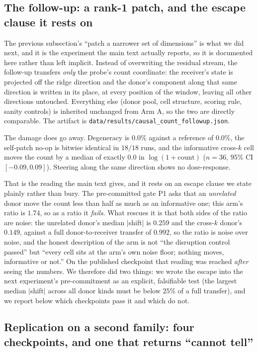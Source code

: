 \documentclass[11pt]{article}
\begin{document}
\subsection{The follow-up: a rank-1 patch, and the escape clause it rests on}

The previous subsection's ``patch a narrower set of dimensions'' is what we did
next, and it is the experiment the main text actually reports, so it is
documented here rather than left implicit. Instead of overwriting the residual
stream, the follow-up transfers \emph{only} the probe's count coordinate: the
receiver's state is projected off the ridge direction and the donor's component
along that same direction is written in its place, at every position of the
window, leaving all other directions untouched. Everything else (donor pool,
cell structure, scoring rule, sanity controls) is inherited unchanged from
Arm A, so the two are directly comparable. The artifact is
\texttt{data/results/causal\_count\_followup.json}.

The damage does go away. Degeneracy is $0.0\%$ against a reference of $0.0\%$,
the self-patch no-op is bitwise identical in $18/18$ runs, and the informative
cross-$k$ cell moves the count by a median of exactly $0.0$ in
$\log(1{+}\text{count})$ ($n{=}36$, $95\%$ CI $[-0.09,0.09]$). Steering along
the same direction shows no dose-response.

That is the reading the main text gives, and it rests on an escape clause we
state plainly rather than bury. The pre-committed gate P1 asks that an
\emph{unrelated} donor move the count less than half as much as an informative
one; this arm's ratio is $1.74$, so as a ratio it \emph{fails}. What rescues it
is that both sides of the ratio are noise: the unrelated donor's median
$|$shift$|$ is $0.259$ and the cross-$k$ donor's $0.149$, against a full
donor-to-receiver transfer of $0.992$, so the ratio is noise over noise, and
the honest description of the arm is not ``the disruption control passed'' but
``every cell sits at the arm's own noise floor; nothing moves, informative or
not.'' On the published checkpoint that reading was reached \emph{after} seeing
the numbers. We therefore did two things: we wrote the escape into the next
experiment's pre-commitment as an explicit, falsifiable test (the largest
median $|$shift$|$ across all donor kinds must be below $25\%$ of a full
transfer), and we report below which checkpoints pass it and which do not.

\subsection{Replication on a second family: four checkpoints, and one that
returns ``cannot tell''}
\end{document}
